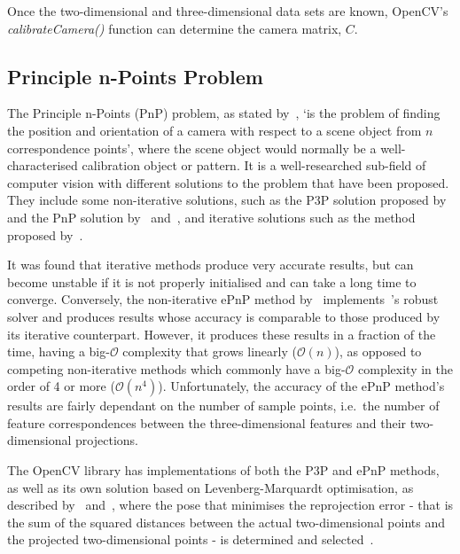 Once the two-dimensional and three-dimensional data sets are known, OpenCV's \emph{calibrateCamera()} function can determine the camera matrix, $C$. 

\subsection{Principle n-Points Problem}

The Principle n-Points (PnP) problem, as stated by~\cite{horaud1989analytic}, `is the problem of finding the position and orientation of a camera with respect to a scene object from $n$ correspondence points', where the scene object would normally be a well-characterised calibration object or pattern. It is a well-researched sub-field of computer vision with different solutions to the problem that have been proposed. They include some non-iterative solutions, such as the P3P solution proposed by~\cite{gao2003complete} and the PnP solution by~\cite{lepetit2009epnp} and~\cite{schweighofer2006robust}, and iterative solutions such as the method proposed by~\cite{lu2000fast}.

It was found that iterative methods produce very accurate results, but can become unstable if it is not properly initialised and can take a long time to converge. Conversely, the non-iterative ePnP method by~\citeauthor{lepetit2009epnp} implements~\citeauthor{schweighofer2006robust}'s robust solver and produces results whose accuracy is comparable to those produced by its iterative counterpart. However, it produces these results in a fraction of the time, having a big-$\mathcal{O}$ complexity that grows linearly ($\mathcal{O}(n)$), as opposed to competing non-iterative methods which commonly have a big-$\mathcal{O}$ complexity in the order of 4 or more ($\mathcal{O}(n^4)$). Unfortunately, the accuracy of the ePnP method's results are fairly dependant on the number of sample points, i.e.\ the number of feature correspondences between the three-dimensional features and their two-dimensional projections. 

The OpenCV library has implementations of both the P3P and ePnP methods, as well as its own solution based on Levenberg-Marquardt optimisation, as described by~\cite{levenberg1944method} and~\cite{marquardt1963algorithm}, where the pose that minimises the reprojection error - that is the sum of the squared distances between the actual two-dimensional points and the projected two-dimensional points - is determined and selected~\citep{opencv-levenberg}. 

